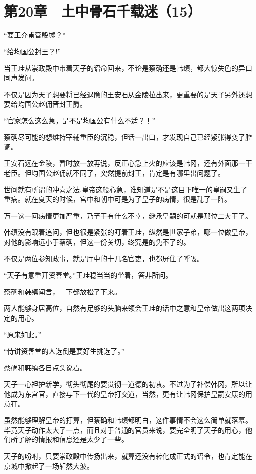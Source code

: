 \section{第20章　土中骨石千载迷（15）}

“要王介甫管殷墟？”

“给均国公封王？!”

当王珪从崇政殿中带着天子的诏命回来，不论是蔡确还是韩缜，都大惊失色的异口同声发问。

不仅是因为天子想要将已经退隐的王安石从金陵拉出来，更重要的是天子另外还想要给均国公赵佣晋封王爵。

“官家怎么这么急，是不是均国公有什么不适？！”

蔡确尽可能的想维持宰辅重臣的沉稳，但话一出口，才发现自己已经紧张得变了腔调。

王安石远在金陵，暂时放一放再说，反正心急上火的应该是韩冈，还有外面那一干老臣。但均国公赵佣就不同了，突然提前封王，肯定是有哪里出问题了。

世间就有所谓的冲喜之法.皇帝这般心急，谁知道是不是这目下唯一的皇嗣又生了重病。就在夏天的时候，宫中和朝中可是为了皇子的病情，很是乱了一阵。

万一这一回病情更加严重，乃至于有什么不幸，继承皇嗣的可就是那位二大王了。

韩缜没有跟着追问，但也很是紧张的盯着王珪，纵然是世家子弟，哪一位做皇帝，对他的影响远小于蔡确，但这一份关切，终究是的免不了的。

不仅是两位参知政事，就是厅中的十几名官吏，也都屏住了呼吸。

“天子有意重开资善堂。”王珪稳当当的坐着，答非所问。

蔡确和韩缜闻言，一下都放松了下来。

两人能够身居高位，自然有足够的头脑来领会王珪的话中之意和皇帝做出这两项决定的用心。

“原来如此。”

“侍讲资善堂的人选倒是要好生挑选了。”

蔡确和韩缜各自点头说着。

天子一心袒护新学，彻头彻尾的要贯彻一道德的初衷。不过为了补偿韩冈，所以让他成为东宫官，直接与下一代的皇帝打交道，当然，更有让韩冈保护皇嗣安康的用意在。

虽然能够理解皇帝的打算，但蔡确和韩缜都明白，这件事情不会这么简单就落幕。毕竟天子动作太大了一点，而且对于普通的官员来说，要完全明了天子的用心，他们所了解的情报和信息还是太少了一些。

天子的吩咐，只要崇政殿中传扬出来，就算还没有转化成正式的诏令，也肯定能在京城中掀起了一场轩然大波。


